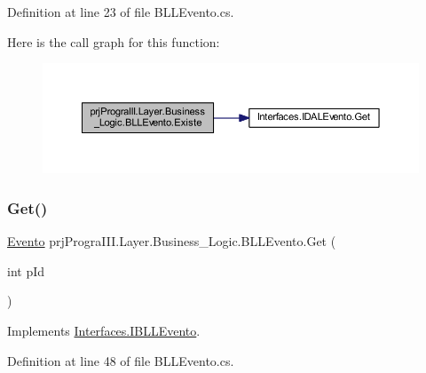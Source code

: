 Definition at line 23 of file B\+L\+L\+Evento.\+cs.

Here is the call graph for this function\+:
\nopagebreak
\begin{figure}[H]
\begin{center}
\leavevmode
\includegraphics[width=350pt]{classprj_progra_i_i_i_1_1_layer_1_1_business___logic_1_1_b_l_l_evento_a5ac56339dc498598e31c5e3dd2c89975_cgraph}
\end{center}
\end{figure}
\hypertarget{classprj_progra_i_i_i_1_1_layer_1_1_business___logic_1_1_b_l_l_evento_a7aeead199812f2510ee3087a7d022c4e}{}\label{classprj_progra_i_i_i_1_1_layer_1_1_business___logic_1_1_b_l_l_evento_a7aeead199812f2510ee3087a7d022c4e} 
\subsubsection{\texorpdfstring{Get()}{Get()}}
{\footnotesize\ttfamily \hyperlink{classprj_progra_i_i_i_1_1_layer_1_1_entities_1_1_evento}{Evento} prj\+Progra\+I\+I\+I.\+Layer.\+Business\+\_\+\+Logic.\+B\+L\+L\+Evento.\+Get (\begin{DoxyParamCaption}\item[{int}]{p\+Id }\end{DoxyParamCaption})}



Implements \hyperlink{interface_interfaces_1_1_i_b_l_l_evento_a1eae40dd8ed0fc8cd36ee9e4ed42f10e}{Interfaces.\+I\+B\+L\+L\+Evento}.



Definition at line 48 of file B\+L\+L\+Evento.\+cs.

